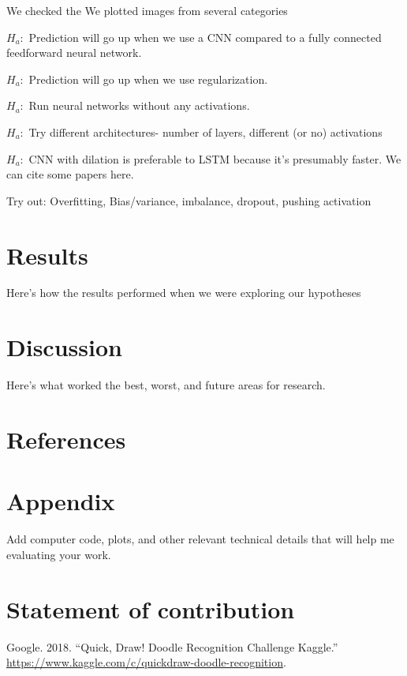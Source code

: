 \documentclass[]{article}
\begin{document}
We checked the We plotted images from several categories

\(H_a:\) Prediction will go up when we use a CNN compared to a fully
connected feedforward neural network.

\(H_a:\) Prediction will go up when we use regularization.

\(H_a:\) Run neural networks without any activations.

\(H_a:\) Try different architectures- number of layers, different (or
no) activations

\(H_a:\) CNN with dilation is preferable to LSTM because it's presumably
faster. We can cite some papers here.

Try out: Overfitting, Bias/variance, imbalance, dropout, pushing
activation

\section{Results}\label{results}

Here's how the results performed when we were exploring our hypotheses

\section{Discussion}\label{discussion}

Here's what worked the best, worst, and future areas for research.

\section{References}\label{references}

\section{Appendix}\label{appendix}

Add computer code, plots, and other relevant technical details that will
help me evaluating your work.

\section*{Statement of contribution}\label{statement-of-contribution}

\hypertarget{refs}{}
\hypertarget{ref-QuickDra10}{}
Google. 2018. ``Quick, Draw! Doodle Recognition Challenge \textbar{}
Kaggle.'' \url{https://www.kaggle.com/c/quickdraw-doodle-recognition}.
\end{document}
